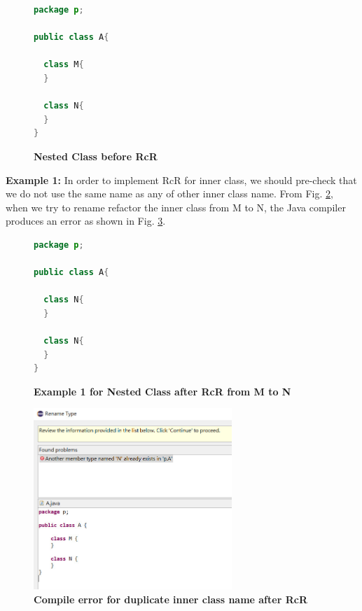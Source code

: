 \begin{figure}[th]
\centering
\begin{minipage}[t]{0.5\linewidth}
\begin{lstlisting}[language=java, basicstyle=\scriptsize\ttfamily,frame=single]
package p;

public class A{	

  class M{
  }

  class N{
  }
} 
\end{lstlisting}
\end{minipage}
\caption{\textbf{Nested Class before RcR}}
\label{fig:original}
\end{figure}

\textbf{Example 1:} In order to implement RcR for inner class, we should pre-check that we do not use the same name as any of other inner class name. From Fig. \ref{fig:nestedclass1}, when we try to rename refactor the inner class from M to N, the Java compiler produces an error as shown in Fig. \ref{fig:NC1}.

\begin{figure}[th]
\centering
\begin{minipage}[t]{0.5\linewidth}
\begin{lstlisting}[language=java, basicstyle=\scriptsize\ttfamily,frame=single]
package p;

public class A{	
    
  class N{
  }
    
  class N{
  }
} 
\end{lstlisting}
\end{minipage}
\caption{\textbf{Example 1 for Nested Class after RcR from M to N}}
\label{fig:nestedclass1}
\end{figure}

\begin{figure}[H]
\centerline{\includegraphics[width=75mm,scale=0.4]{NC1.jpg}}
\caption{\textbf{Compile error for duplicate inner class name after RcR}}
\label{fig:NC1}
\end{figure}

